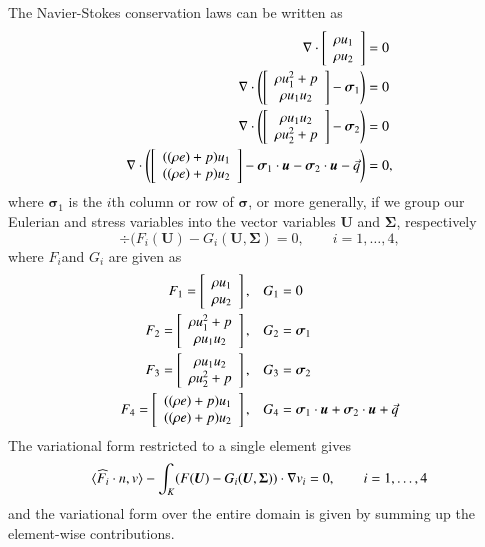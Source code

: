 The Navier-Stokes conservation laws can be written as 
\begin{align*}
\div \vecttwo{\rho u_1 }{\rho u_2} &= 0\\
\div \left(\vecttwo{\rho u_1^2+p }{\rho u_1 u_2} - \boldsymbol \sigma_{1}\right) &=0\\
\div \left(\vecttwo{\rho u_1 u_2}{\rho u_2^2+p } - \boldsymbol \sigma_{2}\right) &=0\\
\div \left(\vecttwo{((\rho e)+p)u_1}{((\rho e)+p)u_2} - \boldsymbol \sigma_1 \cdot \boldsymbol u- \boldsymbol \sigma_2 \cdot \boldsymbol u - \vec{q}\right) &=0,
\end{align*}
where $\boldsymbol \sigma_1$ is the $i$th column or row of $\boldsymbol \sigma$, or more generally, if we group our Eulerian and stress variables into the vector variables $\boldsymbol U$ and $\boldsymbol \Sigma$, respectively
\[
\div (F_i(\boldsymbol U)-G_i(\boldsymbol U,\boldsymbol \Sigma) = 0, \qquad i = 1,\ldots, 4,
\]
where $F_i$and $G_i$ are given as
\begin{align*}
F_1 = \vecttwo{\rho u_1 }{\rho u_2}, \quad &G_1 = 0\\
F_2 = \vecttwo{\rho u_1^2+p }{\rho u_1 u_2},\quad &G_2 = \boldsymbol \sigma_{1}\\
F_3 = \vecttwo{\rho u_1 u_2}{\rho u_2^2+p }, \quad &G_3 = \boldsymbol \sigma_{2}\\
F_4 = \vecttwo{((\rho e)+p)u_1}{((\rho e)+p)u_2}, \quad &G_4 = \boldsymbol \sigma_1 \cdot \boldsymbol u + \boldsymbol \sigma_2 \cdot \boldsymbol u + \vec{q}
\end{align*}
The variational form restricted to a single element gives
\[
\langle \widehat{F}_i\cdot n, v\rangle - \int_K  (F(\boldsymbol U)-G_i(\boldsymbol U,\boldsymbol \Sigma)) \cdot \grad v_i = 0 , \qquad i = 1,\ldots, 4
\]
and the variational form over the entire domain is given by summing up the element-wise contributions. 

